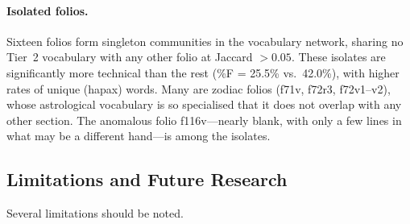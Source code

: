 \paragraph{Isolated folios.}
Sixteen folios form singleton communities in the vocabulary network, sharing no Tier~2 vocabulary with any other folio at Jaccard $> 0.05$.  These isolates are significantly more technical than the rest (\%F = 25.5\% vs.\ 42.0\%), with higher rates of unique (hapax) words.  Many are zodiac folios (f71v, f72r3, f72v1--v2), whose astrological vocabulary is so specialised that it does not overlap with any other section.  The anomalous folio f116v---nearly blank, with only a few lines in what may be a different hand---is among the isolates.

\subsection{Limitations and Future Research}

Several limitations should be noted.

